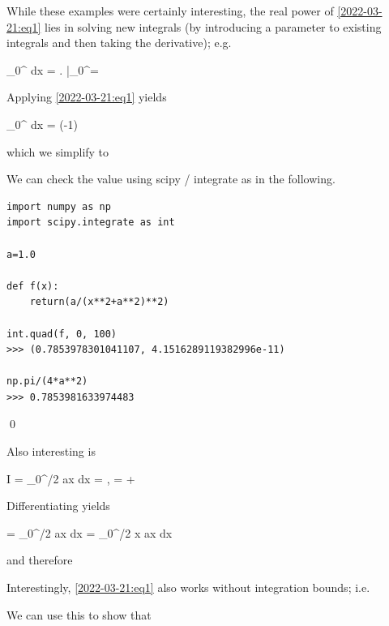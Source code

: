 While these examples were certainly interesting, the real power of \eqref{2022-03-21:eq1} lies in solving new integrals (by introducing a parameter to existing integrals and then taking the derivative); e.g.

\bee
\int_0^\infty {} dx =  \left. \arctan {} \right|_0^\infty = 
\eee

Applying \eqref{2022-03-21:eq1} yields

\bee
\int_0^\infty {} dx = (-1) 
\eee

which we simplify to

\bee
{}
\eee

We can check the value using scipy / integrate as in the following.

\begin{verbatim}
import numpy as np
import scipy.integrate as int

a=1.0

def f(x):
    return(a/(x**2+a**2)**2)

int.quad(f, 0, 100)
>>> (0.7853978301041107, 4.1516289119382996e-11)
    
np.pi/(4*a**2)
>>> 0.7853981633974483
\end{verbatim}

\qed


Also interesting is

\bee
I = \int_0^{\pi/2} \sin ax dx = , \quad {} =  + 
\eee

Differentiating yields

\bee
{} = \int_0^{\pi/2} \sin ax dx = \int_0^{\pi/2} x \cos ax dx
\eee

and therefore

\bee
{}
\eee

Interestingly, \eqref{2022-03-21:eq1} also works without integration bounds; i.e.

\bee
{}
\eee

We can use this to show that

\bee
{}
\eee

